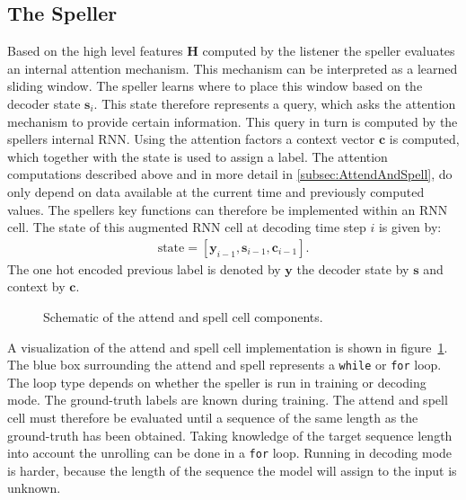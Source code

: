\subsection{The Speller}
Based on the high level features $\mathbf{H}$ computed by the listener the speller evaluates an internal attention mechanism. This mechanism can be interpreted as a learned sliding window. The speller learns where to place this window based on the decoder state $\mathbf{s}_i$. This state therefore represents a query, which asks the attention mechanism to provide certain information. This query in turn is computed by the spellers internal RNN.  Using the attention factors a context vector $\mathbf{c}$ is computed, which together with the state is used to assign a label. 
The attention computations described above and in more detail in \ref{subsec:AttendAndSpell}, do only depend on data available at the current time and previously computed values. The spellers key functions can therefore be implemented within an RNN cell. The state of this augmented RNN cell at decoding time step $i$ is given by:
\begin{align}
\text{state} =  [\mathbf{y}_{i-1}, \mathbf{s}_{i-1}, \mathbf{c}_{i-1}].
\end{align}
The one hot encoded previous label is denoted by $\mathbf{y}$ the decoder state by $\mathbf{s}$ and context by $\mathbf{c}$.
\begin{figure}
\centering

\caption{Schematic of the attend and spell cell components.}
\label{fig:asCell}
\end{figure}
A visualization of the attend and spell cell implementation is shown in figure~\ref{fig:asCell}. The blue box surrounding the attend and spell represents a \texttt{while} or \texttt{for} loop. The loop type depends on whether the speller is run in training or decoding mode. 
The ground-truth labels are known during training. The attend and spell cell must therefore be evaluated until a sequence of the same length as the ground-truth has been obtained. Taking knowledge of the target sequence length into account the unrolling can be done in a \texttt{for} loop. 
Running in decoding mode is harder, because the length of the sequence the model will assign to the input is unknown. 

